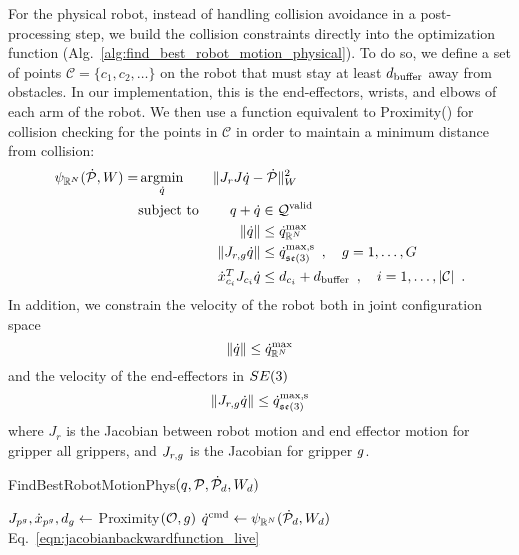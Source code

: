 For the physical robot, instead of handling collision avoidance in a post-processing step, we build the collision constraints directly into the optimization function (Alg.~\ref{alg:find_best_robot_motion_physical}). To do so, we define a set of points  $\mathcal{C} = \{c_1, c_2, \dots \}$ on the robot that must stay at least $d_\textrm{buffer}$ away from obstacles. In our implementation, this is the end-effectors, wrists, and elbows of each arm of the robot. We then use a function equivalent to Proximity() for collision checking for the points in $\mathcal{C}$ in order to maintain a minimum distance from collision:
\begin{equation}
\begin{aligned}
    \DeformBackwardFn_{\reals^N}(\deformvel, \Pinvweight) = 
        &\argmin_{\robotvel}    & & \| J_r J \grippervel - \deformvel \|^2_{\Pinvweight} \\
        &\text{subject to}      & & \hspace{1.2cm} \llap{$\robotconfig + \robotvel$} \in \robotCvalid \\
        &                       & & \hspace{1.2cm} \llap{$\| \robotvel \|$}          \leq \physrobotvelmax \\
        &                       & & \hspace{1.2cm} \llap{$\| J_{r,\gripperidx} \robotvel \|$}  \leq \grippervelmaxservo \enspace , \quad g = 1, \dots, \ngrippers \\
        &                       & & \hspace{1.2cm} \llap{$\dot x_{c_i}^T J_{c_i} \grippervel$} \leq d_{c_i} + \dbuffer \enspace , \quad i = 1, \dots, |\mathcal{C}| \enspace .
\label{eqn:jacobianbackwardfunction_live}
\end{aligned}
\end{equation}
In addition, we constrain the velocity of the robot both in joint configuration space 
$$ \| \dot{q} \| \leq \dot{q}^\textrm{max}_{\mathbb{R}^N} $$
and the velocity of the end-effectors in $SE(3)$ 
$$ \| J_{r,g} \dot{q} \| \leq \dot{q}^\textrm{max,s}_{\mathfrak{se}(3)} $$
where $J_r$ is the Jacobian between robot motion and end effector motion for gripper all grippers, and $J_{r,g}$ is the Jacobian for gripper $g$.

\begin{algorithm}[h]
\caption{FindBestRobotMotionPhys$(q, \mathcal{P}, \dot{\mathcal{P}}_d, W_d)$}
\label{alg:find_best_robot_motion_physical}
\begin{algorithmic}[1]
        \State $J_{p^g}, \dot x _{p^g}, d_g \gets$ Proximity$(\mathcal{O}, g)$
    \EndFor
    \State $\dot{q}^{\textrm{cmd}} \gets \psi_{\mathbb{R}^{N}} (\dot{\mathcal{P}}_d, W_d)$ \hfill Eq.~\eqref{eqn:jacobianbackwardfunction_live}
\end{algorithmic}
\end{algorithm}

